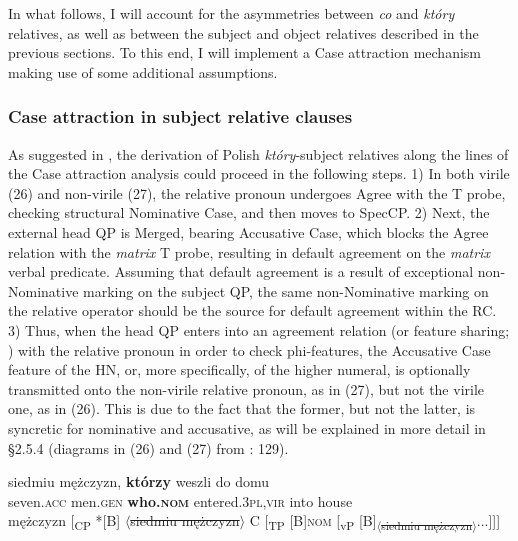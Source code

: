 \documentclass[output=paper]{langsci/langscibook}
\begin{document}
In what follows, I will account for the asymmetries between \textit{co} and \textit{który} relatives, as well as between the subject and object relatives described in the previous sections. To this end, I will implement a Case attraction mechanism making use of some additional assumptions.  

\subsubsection{Case attraction in subject relative clauses}%

As suggested in \citet{Łęska2016}, the derivation of Polish \textit{który}{}-subject relatives along the lines of the Case attraction analysis could proceed in the following steps. 1) In both virile (26) and non-virile (27), the relative pronoun undergoes Agree with the T probe, checking structural Nominative Case, and then moves to SpecCP. 2) Next, the external head QP is Merged, bearing Accusative Case, which blocks the Agree relation with the \textit{matrix} T probe, resulting in default agreement on the \textit{matrix} verbal predicate. Assuming that default agreement is a result of exceptional non-Nominative marking on the subject QP, the same non-Nominative marking on the relative operator should be the source for default agreement within the RC. 3) Thus, when the head QP enters into an agreement relation (or feature sharing; \citealt{Bader2006}) with the relative pronoun in order to check phi-features, the Accusative Case feature of the HN, or, more specifically, of the higher numeral, is optionally transmitted onto the non-virile relative pronoun, as in (27), but not the virile one, as in (26). This is due to the fact that the former, but not the latter, is syncretic for nominative and accusative, as will be explained in more detail in §2.5.4 (diagrams in (26) and (27) from \citealt{Łęska2016}: 129).

\ea%
    \label{ex:leska:26}
    \gll siedmiu   mężczyzn,   \textbf{którzy}   weszli     do   domu\\
         seven.\textsc{acc}   men.\textsc{gen}   \textbf{who.\textsc{nom}}   entered.\textsc{3pl,vir} into   house \\
    \glt {} mężczyzn [\textsubscript{CP} *[B] $\langle$\sout{siedmiu mężczyzn}$\rangle$ C [\textsubscript{TP} [B]{\footnotesize\textsc{nom}} [\textsubscript{vP} [B]\textsubscript{$\langle$\sout{siedmiu mężczyzn}$\rangle$}...]]]
\z
\end{document}
